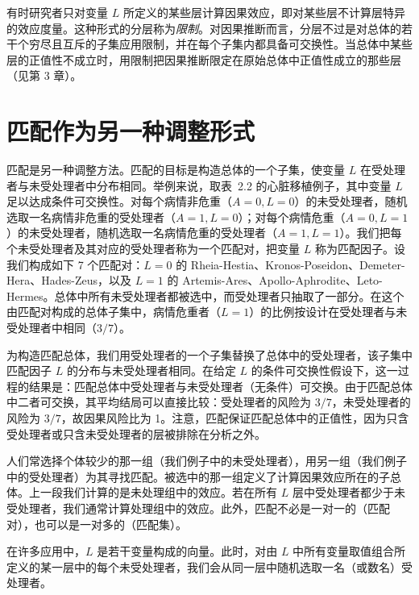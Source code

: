 有时研究者只对变量 $L$ 所定义的某些层计算因果效应，即对某些层不计算层特异的效应度量。这种形式的分层称为\emph{限制}。对因果推断而言，分层不过是对总体的若干个穷尽且互斥的子集应用限制，并在每个子集内都具备可交换性。当总体中某些层的正值性不成立时，用限制把因果推断限定在原始总体中正值性成立的那些层（见第 3 章）。

\section{匹配作为另一种调整形式}

匹配是另一种调整方法。匹配的目标是构造总体的一个子集，使变量 $L$ 在受处理者与未受处理者中分布相同。举例来说，取表~2.2 的心脏移植例子，其中变量 $L$ 足以达成条件可交换性。对每个病情非危重（$A=0,L=0$）的未受处理者，随机选取一名病情非危重的受处理者（$A=1,L=0$）；对每个病情危重（$A=0,L=1$）的未受处理者，随机选取一名病情危重的受处理者（$A=1,L=1$）。我们把每个未受处理者及其对应的受处理者称为一个匹配对，把变量 $L$ 称为匹配因子。设我们构成如下 7 个匹配对：$L=0$ 的 Rheia-Hestia、Kronos-Poseidon、Demeter-Hera、Hades-Zeus，以及 $L=1$ 的 Artemis-Ares、Apollo-Aphrodite、Leto-Hermes。总体中所有未受处理者都被选中，而受处理者只抽取了一部分。在这个由匹配对构成的总体子集中，病情危重者（$L=1$）的比例按设计在受处理者与未受处理者中相同（$3/7$）。

为构造匹配总体，我们用受处理者的一个子集替换了总体中的受处理者，该子集中匹配因子 $L$ 的分布与未受处理者相同。在给定 $L$ 的条件可交换性假设下，这一过程的结果是：匹配总体中受处理者与未受处理者（无条件）可交换。由于匹配总体中二者可交换，其平均结局可以直接比较：受处理者的风险为 $3/7$，未受处理者的风险为 $3/7$，故因果风险比为 1。注意，匹配保证匹配总体中的正值性，因为只含受处理者或只含未受处理者的层被排除在分析之外。

人们常选择个体较少的那一组（我们例子中的未受处理者），用另一组（我们例子中的受处理者）为其寻找匹配。被选中的那一组定义了计算因果效应所在的子总体。上一段我们计算的是未处理组中的效应。若在所有 $L$ 层中受处理者都少于未受处理者，我们通常计算处理组中的效应。此外，匹配不必是一对一的（匹配对），也可以是一对多的（匹配集）。

在许多应用中，$L$ 是若干变量构成的向量。此时，对由 $L$ 中所有变量取值组合所定义的某一层中的每个未受处理者，我们会从同一层中随机选取一名（或数名）受处理者。


